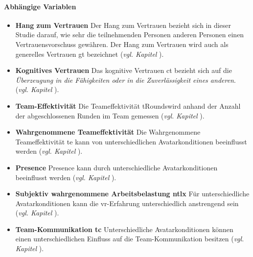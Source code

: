 \documentclass[a4paper,11pt]{article}%
\renewcommand{\\}{\vspace*{0.5\baselineskip} \newline}
\begin{document}
	\paragraph{Abhängige Variablen}
\begin{itemize}
\item \textbf{Hang zum Vertrauen} Der Hang zum Vertrauen bezieht sich in dieser Studie darauf, wie sehr die teilnehmenden Personen  anderen Personen einen Vertrauensvorschuss gewähren. Der Hang zum Vertrauen wird auch als generelles Vertrauen \ac{gt} bezeichnet\citep[p.30]{mcallister1995affect} (\textit{vgl. Kapitel }).
\item \textbf{Kognitives Vertrauen} Das kognitive Vertrauen \ac{ct} bezieht sich auf die \textit{Überzeugung in die Fähigkeiten oder in die Zuverlässigkeit eines anderen}. \citep[p.30]{mcallister1995affect} (\textit{vgl. Kapitel }).
\item \textbf{Team-Effektivität} Die Teameffektivität \ac{tRounds}wird anhand der Anzahl der abgeschlossenen Runden im Team gemessen (\textit{vgl. Kapitel }).
\item \textbf{Wahrgenommene Teameffektivität} Die Wahrgenommene Teameffektivität \ac{te} kann von unterschiedlichen Avatarkonditionen beeinflusst werden (\textit{vgl. Kapitel }).
\item \textbf{Presence} Presence  kann durch unterschiedliche Avatarkonditionen beeinflusst werden (\textit{vgl. Kapitel }).
\item \textbf{Subjektiv wahrgenommene Arbeitsbelastung \ac{ntlx}} Für unterschiedliche Avatarkonditionen kann die \ac{vr}-Erfahrung unterschiedlich anstrengend sein (\textit{vgl. Kapitel }).
\item \textbf{Team-Kommunikation \ac{tc}} Unterschiedliche Avatarkonditionen können einen unterschiedlichen Einfluss auf die Team-Kommunikation besitzen (\textit{vgl. Kapitel }).
\end{itemize}
				
\end{document}
